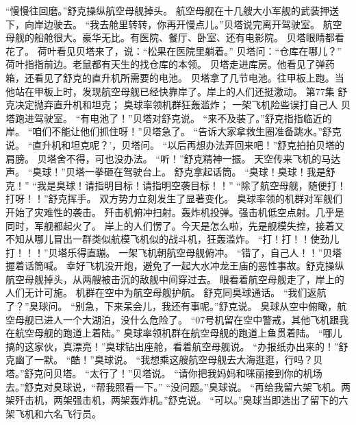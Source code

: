 \documentclass[a4paper,12pt,UTF8,twoside]{ctexbook}
\begin{document}
        “慢慢往回磨。”舒克操纵航空母舰掉头。 
        航空母舰在十几艘大小军舰的武装押送下，向岸边驶去。 
        “我去舱里转转，你再开慢点儿。”贝塔说完离开驾驶室。 
        航空母舰的船舱很大。豪华无比。有医院、餐厅、卧室、还有电影院。 
        贝塔眼睛都看花了。 
        荷叶看见贝塔来了，说：“松果在医院里躺着。” 
        贝塔问：“仓库在哪儿？” 
        荷叶指指前边。老鼠都有天生的找仓库的本领。 
        贝塔走进库房。他看见了弹药箱，还看见了舒克的直升机所需要的电池。 
        贝塔拿了几节电池。往甲板上跑。当他站在甲板上时，发现航空母舰已经快靠岸了。岸上的人们还挺激动。   第77集 
        舒克决定抛弃直升机和坦克； 
        臭球率领机群狂轰滥炸； 
        一架飞机险些误打自己人   
        贝塔跑进驾驶室。 
        “有电池了！”贝塔对舒克说。 
        “来不及装了。”舒克指指临近的岸。 
        “咱们不能让他们抓住呀！”贝塔急了。 
        “告诉大家拿救生圈准备跳水。”舒克说。 
        “直升机和坦克呢？’，贝塔问。 
        “以后再想办法弄回来吧！”舒克拍拍贝塔的肩膀。 
        贝塔舍不得，可也没办法。 
        “听！”舒克精神一振。 
        天空传来飞机的马达声。 
        “臭球！”贝塔一拳砸在驾驶台上。 
        舒克拿起话筒。 
        “臭球！臭球！我是舒克！” 
        “我是臭球！请指明目标！请指明空袭目标！！” 
        “除了航空母舰，随便打！打呀！！”舒克挥手。 
        双方势力立刻发生了显著变化。 
        臭球率领的机群对军舰们开始了灾难性的袭击。 
        歼击机俯冲扫射。轰炸机投弹。强击机低空点射。几乎是同时，军舰都起火了。 
        岸上的人们愣了。今天是怎么啦，先是舰模失控，接着又不知从哪儿冒出一群类似航模飞机似的战斗机，狂轰滥炸。 
        “打！打！！使劲儿打！！！”贝塔乐得直蹦。 
        一架飞机朝航空母舰俯冲。 
        “错了，自己人！！”贝塔握着话筒喊。 
        幸好飞机没开炮，避免了一起大水冲龙王庙的恶性事故。舒克操纵航空母舰掉头，从两艘被击沉的敌舰中间穿过去。 
        眼看着航空母舰走了，岸上的人们无计可施。 
        机群在空中为航空母舰护航。 
        舒克同臭球通话。 
        “我们返航了？”臭球问。 
        “别急，下来呆会儿，我还有事呢。”舒克说。 
        臭球从空中俯瞰，航空母舰已进人一个大湖泊，没什么危险了。 
        “07号机留在空中警戒，其他飞机跟我在航空母舰的跑道上着陆。” 
        臭球率领机群在航空母舰的跑道上鱼贯着陆。 
        “哪儿搞的这家伙，真漂亮！”臭球钻出座舱，看着航空母舰说。 
        “办报纸办出来的！”舒克幽了一默。 
        “酷！”臭球说。 
        “我想乘这艘航空母舰去大海逛逛，行吗？贝塔。”舒克问贝塔。 
        “太行了！”贝塔说。 
        “请你把我妈妈和咪丽接到你的机场去。”舒克对臭球说，“帮我照看一下。” 
        “没问题。”臭球说。 
        “再给我留六架飞机。两架歼击机，两架强击机，两架轰炸机。”舒克说。 
        “可以。”臭球当即选出了留下的六架飞机和六名飞行员。 
\end{document}
